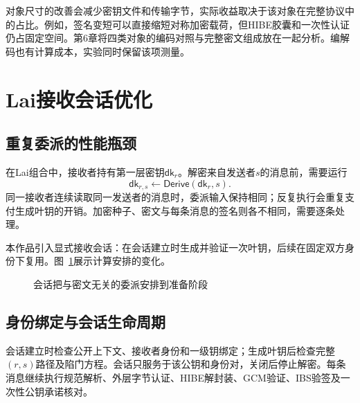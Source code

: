 对象尺寸的改善会减少密钥文件和传输字节，实际收益取决于该对象在完整协议中的占比。例如，签名变短可以直接缩短对称加密载荷，但HIBE胶囊和一次性认证仍占固定空间。第6章将四类对象的编码对照与完整密文组成放在一起分析。编解码也有计算成本，实验同时保留该项测量。

\section{Lai接收会话优化}
\label{sec:lai-session}
\subsection{重复委派的性能瓶颈}
在Lai组合中，接收者持有第一层密钥$\mathsf{dk}_r$。解密来自发送者$s$的消息前，需要运行
\[
 \mathsf{dk}_{r,s}\leftarrow\mathsf{Derive}(\mathsf{dk}_r,s).
\]
同一接收者连续读取同一发送者的消息时，委派输入保持相同；反复执行会重复支付生成叶钥的开销。加密种子、密文与每条消息的签名则各不相同，需要逐条处理。

本作品引入显式接收会话：在会话建立时生成并验证一次叶钥，后续在固定双方身份下复用。图~\ref{fig:receiver-session}展示计算安排的变化。

\begin{figure}[H]
\centering
{}
\caption{会话把与密文无关的委派安排到准备阶段}
\label{fig:receiver-session}
\end{figure}

\subsection{身份绑定与会话生命周期}
会话建立时检查公开上下文、接收者身份和一级钥绑定；生成叶钥后检查完整$(r,s)$路径及陷门方程。会话只服务于该公钥和身份对，关闭后停止解密。每条消息继续执行规范解析、外层字节认证、HIBE解封装、GCM验证、IBS验签及一次性公钥承诺核对。

